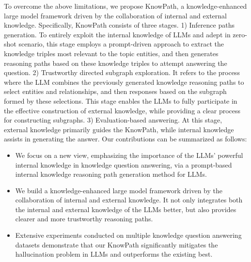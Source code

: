 To overcome the above limitations, we propose KnowPath, a knowledge-enhanced large model framework driven by the collaboration of internal and external knowledge. 
Specifically, KnowPath consists of three stages.
1) Inference paths generation. To entirely exploit the internal knowledge of LLMs and adept in zero-shot scenario, this stage employs a prompt-driven approach to extract the knowledge triples most relevant to the topic entities, and then generates reasoning paths based on these knowledge triples to attempt answering the question. 
2) Trustworthy directed subgraph exploration. It refers to the process where the LLM combines the previously generated knowledge reasoning paths to select entities and relationships, and then responses based on the subgraph formed by these selections. This stage enables the LLMs to fully participate in the effective construction of external knowledge, while providing a clear process for constructing subgraphs.
3) Evaluation-based answering. At this stage, external knowledge primarily guides the KnowPath, while internal knowledge assists in generating the answer.
Our contributions can be summarized as follows:
\begin{itemize}
    \item We focus on a new view, emphasizing the importance of the LLMs' powerful internal knowledge in knowledge question answering, via a prompt-based internal knowledge reasoning path generation method for LLMs.
    \item We build a knowledge-enhanced large model framework driven by the collaboration of internal and external knowledge. It not only integrates both the internal and external knowledge of the LLMs better, but also provides clearer and more trustworthy reasoning paths.
    \item Extensive experiments conducted on multiple knowledge question answering datasets demonstrate that our KnowPath significantly mitigates the hallucination problem in LLMs and outperforms the existing best.
\end{itemize}




